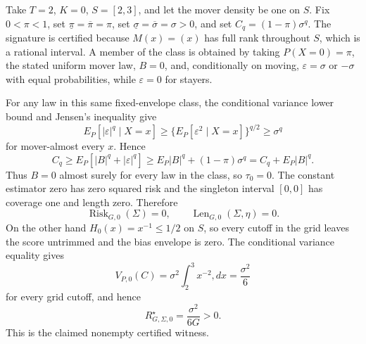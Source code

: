 Take \(T=2\), \(K=0\), \(S=[2,3]\), and let the mover density be one on \(S\). Fix \(0<\pi<1\), set \(\underline\pi=\overline\pi=\pi\), set \(\underline\sigma=\overline\sigma=\sigma>0\), and set \(C_q=(1-\pi)\sigma^q\). The signature is certified because \(M(x)=(x)\) has full rank throughout \(S\), which is a rational interval. A member of the class is obtained by taking \(P(X=0)=\pi\), the stated uniform mover law, \(B=0\), and, conditionally on moving, \(\varepsilon=\sigma\) or \(-\sigma\) with equal probabilities, while \(\varepsilon=0\) for stayers.

For any law in this same fixed-envelope class, the conditional variance lower bound and Jensen's inequality give
\[
E_P[|\varepsilon|^q\mid X=x]
\ge \{E_P[\varepsilon^2\mid X=x]\}^{q/2}
\ge\sigma^q
\]
for mover-almost every \(x\). Hence
\[
C_q\ge E_P[|B|^q+|\varepsilon|^q]
\ge E_P|B|^q+(1-\pi)\sigma^q=C_q+E_P|B|^q.
\]
Thus \(B=0\) almost surely for every law in the class, so \(\tau_0=0\). The constant estimator zero has zero squared risk and the singleton interval \([0,0]\) has coverage one and length zero. Therefore
\[
\operatorname{Risk}_{G,0}(\Sigma)=0,
\qquad
\operatorname{Len}_{G,0}(\Sigma,\eta)=0.
\]
On the other hand \(H_0(x)=x^{-1}\le1/2\) on \(S\), so every cutoff in the grid leaves the score untrimmed and the bias envelope is zero. The conditional variance equality gives
\[
V_{P,0}(C)=\sigma^2\int_2^3x^{-2},dx=\frac{\sigma^2}{6}
\]
for every grid cutoff, and hence
\[
R_{G,\Sigma,0}^{\star}=\frac{\sigma^2}{6G}>0.
\]
This is the claimed nonempty certified witness.